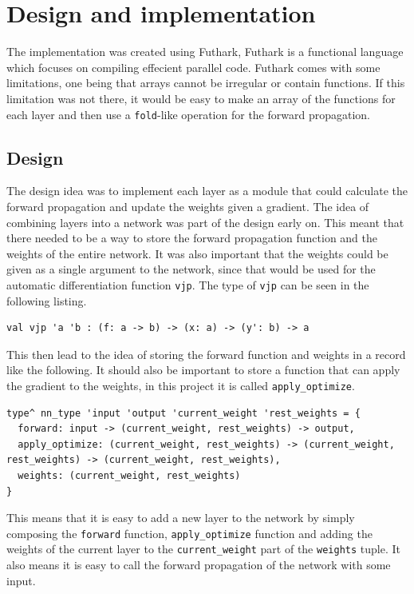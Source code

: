 \section{Design and implementation}%
\label{sec:impl}

The implementation was created using Futhark, Futhark is a functional language which focuses on compiling effecient parallel code.
Futhark comes with some limitations, one being that arrays cannot be irregular or contain functions.
If this limitation was not there, it would be easy to make an array of the functions for each layer and then use a \texttt{fold}-like operation for the forward propagation.

\subsection{Design}

The design idea was to implement each layer as a module that could calculate the forward propagation and update the weights given a gradient.
The idea of combining layers into a network was part of the design early on.
This meant that there needed to be a way to store the forward propagation function and the weights of the entire network.
It was also important that the weights could be given as a single argument to the network, since that would be used for the automatic differentiation function \texttt{vjp}. The type of \texttt{vjp} can be seen in the following listing.
\begin{lstlisting}
val vjp 'a 'b : (f: a -> b) -> (x: a) -> (y': b) -> a
\end{lstlisting}

This then lead to the idea of storing the forward function and weights in a record like the following. It should also be important to store a function that can apply the gradient to the weights, in this project it is called \texttt{apply\_optimize}.

\begin{lstlisting}
type^ nn_type 'input 'output 'current_weight 'rest_weights = {
  forward: input -> (current_weight, rest_weights) -> output,
  apply_optimize: (current_weight, rest_weights) -> (current_weight, rest_weights) -> (current_weight, rest_weights),
  weights: (current_weight, rest_weights)
}
\end{lstlisting}

This means that it is easy to add a new layer to the network by simply composing the \texttt{forward} function, \texttt{apply\_optimize} function and adding the weights of the current layer to the \texttt{current\_weight} part of the \texttt{weights} tuple.
It also means it is easy to call the forward propagation of the network with some input.

